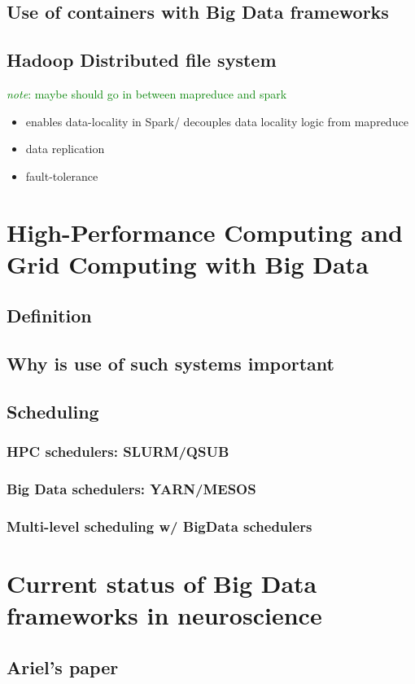 \documentclass{report}
\newcommand{\note}[1]{\textcolor{green}{\textit{note}: #1}}
\begin{document}
	\section{Use of containers with Big Data frameworks}
	\section{Hadoop Distributed file system}
		\note{maybe should go in between mapreduce and spark}
		\begin{itemize}
			\item enables data-locality in Spark/ decouples data locality logic from mapreduce\
			\item data replication
			\item fault-tolerance
		\end{itemize}
\chapter{High-Performance Computing and Grid Computing with Big Data}
	\section{Definition}
	\section{Why is use of such systems important}
	\section{Scheduling}
		\subsection{HPC schedulers: SLURM/QSUB}
		\subsection{Big Data schedulers: YARN/MESOS}
		\subsection{Multi-level scheduling w/ BigData schedulers}
\chapter{Current status of Big Data frameworks in neuroscience}
	\section{Ariel's paper}
\end{document}
